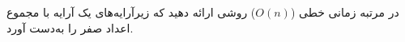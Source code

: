 در مرتبه زمانی خطی ($O(n)$) روشی ارائه دهید که زیرآرایه‌های یک آرایه با مجموع اعداد صفر را به‌دست آورد.